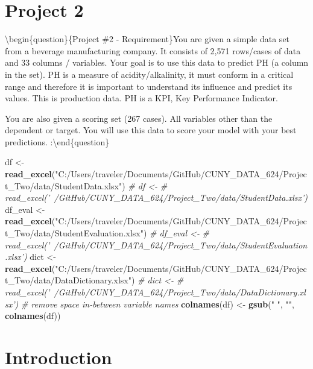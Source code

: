 \documentclass[]{report}
\newenvironment{Shaded}{\begin{snugshade}}{\end{snugshade}}
\newcommand{\CommentTok}[1]{\textcolor[rgb]{0.56,0.35,0.01}{\textit{#1}}}
\newcommand{\KeywordTok}[1]{\textcolor[rgb]{0.13,0.29,0.53}{\textbf{#1}}}
\newcommand{\NormalTok}[1]{#1}
\newcommand{\StringTok}[1]{\textcolor[rgb]{0.31,0.60,0.02}{#1}}
\begin{document}
\newpage

\hypertarget{AS-1}{%
\chapter*{Project 2}\label{AS-1}}

\textbackslash begin\{question\}\{Project \#2 - Requirement\}You are
given a simple data set from a beverage manufacturing company. It
consists of 2,571 rows/cases of data and 33 columns / variables. Your
goal is to use this data to predict PH (a column in the set). PH is a
measure of acidity/alkalinity, it must conform in a critical range and
therefore it is important to understand its influence and predict its
values. This is production data. PH is a KPI, Key Performance Indicator.

You are also given a scoring set (267 cases). All variables other than
the dependent or target. You will use this data to score your model with
your best predictions. :\textbackslash end\{question\}

\begin{Shaded}
\begin{Highlighting}[]
\NormalTok{df <-}\StringTok{ }\KeywordTok{read_excel}\NormalTok{(}\StringTok{"C:/Users/traveler/Documents/GitHub/CUNY_DATA_624/Project_Two/data/StudentData.xlsx"}\NormalTok{)}
\CommentTok{# df <-}
\CommentTok{# read_excel('~/GitHub/CUNY_DATA_624/Project_Two/data/StudentData.xlsx')}
\NormalTok{df_eval <-}\StringTok{ }\KeywordTok{read_excel}\NormalTok{(}\StringTok{"C:/Users/traveler/Documents/GitHub/CUNY_DATA_624/Project_Two/data/StudentEvaluation.xlsx"}\NormalTok{)}
\CommentTok{# df_eval <-}
\CommentTok{# read_excel('~/GitHub/CUNY_DATA_624/Project_Two/data/StudentEvaluation.xlsx')}
\NormalTok{dict <-}\StringTok{ }\KeywordTok{read_excel}\NormalTok{(}\StringTok{"C:/Users/traveler/Documents/GitHub/CUNY_DATA_624/Project_Two/data/DataDictionary.xlsx"}\NormalTok{)}
\CommentTok{# dict <-}
\CommentTok{# read_excel('~/GitHub/CUNY_DATA_624/Project_Two/data/DataDictionary.xlsx')}
\CommentTok{# remove space in-between variable names}
\KeywordTok{colnames}\NormalTok{(df) <-}\StringTok{ }\KeywordTok{gsub}\NormalTok{(}\StringTok{" "}\NormalTok{, }\StringTok{""}\NormalTok{, }\KeywordTok{colnames}\NormalTok{(df))}
\end{Highlighting}
\end{Shaded}

\newpage
\clearpage
{}

\hypertarget{intro}{%
\chapter*{Introduction}\label{intro}}
\end{document}

